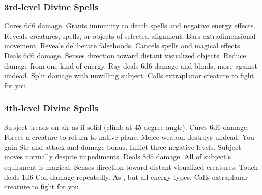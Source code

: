 \subsubsection{3rd-level Divine Spells}
\begin{spelllist}
   Cures 6d6 damage.
   Grants immunity to death spells and negative energy effects.
   Reveals creatures, spells, or objects of selected alignment.
   Bars extradimensional movement.
   Reveals deliberate falsehoods.
   Cancels spells and magical effects.
   Deals 6d6 damage.
   Senses direction toward distant visualized objects.
   Reduce damage from one kind of energy.
   Ray deals 6d6 damage and blinds, more against undead.
    Split damage with unwilling subject.
   Calls extraplanar creature to fight for you.
\end{spelllist}

\subsubsection{4th-level Divine Spells}
\begin{spelllist}
   Subject treads on air as if solid (climb at 45-degree angle).
   Cures 6d6 damage.
   Forces a creature to return to native plane.
   Melee weapon destroys undead.
   You gain  Str and attack and damage bonus.
   Inflict three negative levels.
   Subject moves normally despite impediments.
   Deals 8d6 damage.
   All of subject's equipment is magical.
   Senses direction toward distant visualized creatures.
   Touch deals 1d6 Con damage repeatedly.
   As , but all energy types.
   Calls extraplanar creature to fight for you.
\end{spelllist}

